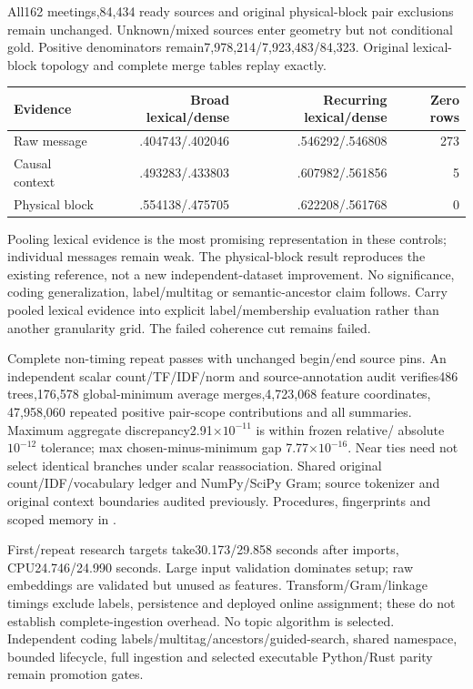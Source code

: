 \documentclass[11pt]{article}
\begin{document}
All162 meetings,84,434 ready sources and original physical-block pair exclusions
remain unchanged. Unknown/mixed sources enter geometry but not conditional
gold. Positive denominators remain7,978,214/7,923,483/84,323. Original
lexical-block topology and complete merge tables replay exactly.
\begin{center}
\begin{tabular}{lrrr}
Evidence & Broad lexical/dense & Recurring lexical/dense & Zero rows\\
\hline
Raw message & .404743/.402046 & .546292/.546808 & 273\\
Causal context & .493283/.433803 & .607982/.561856 & 5\\
Physical block & .554138/.475705 & .622208/.561768 & 0\\
\end{tabular}
\end{center}
Pooling lexical evidence is the most promising representation in these controls;
individual messages remain weak. The physical-block result reproduces the
existing reference, not a new independent-dataset improvement. No significance,
coding generalization, label/multitag or semantic-ancestor claim follows. Carry
pooled lexical evidence into explicit label/membership evaluation rather than
another granularity grid. The failed coherence cut remains failed.

Complete non-timing repeat passes with unchanged begin/end source pins.
An independent scalar count/TF/IDF/norm and source-annotation audit verifies486
trees,176,578 global-minimum average merges,4,723,068 feature coordinates,
47,958,060 repeated positive pair-scope contributions and all summaries.
Maximum aggregate discrepancy2.91$\times10^{-11}$ is within frozen relative/
absolute$10^{-12}$ tolerance; max chosen-minus-minimum gap
7.77$\times10^{-16}$. Near ties need not select identical branches under scalar
reassociation. Shared original count/IDF/vocabulary ledger and NumPy/SciPy Gram;
source tokenizer and original context boundaries audited previously. Procedures,
fingerprints and scoped memory in
.

First/repeat research targets take30.173/29.858 seconds after imports,
CPU24.746/24.990 seconds. Large input validation dominates setup; raw embeddings
are validated but unused as features. Transform/Gram/linkage timings exclude
labels, persistence and deployed online assignment; these do not establish
complete-ingestion overhead. No topic algorithm is selected. Independent coding
labels/multitag/ancestors/guided-search, shared namespace, bounded lifecycle,
full ingestion and selected executable Python/Rust parity remain promotion gates.
\end{document}
